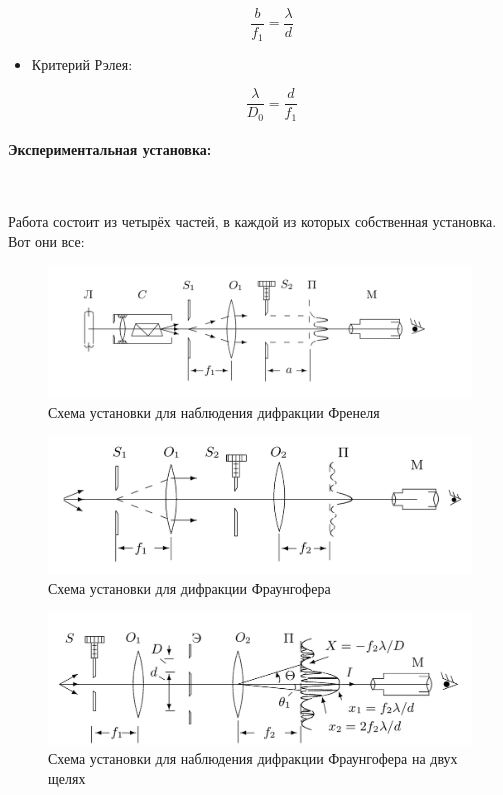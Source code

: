 \documentclass[a4paper, 12pt]{article}
\newcommand{\parag}[1]{\paragraph*{#1:}}
\begin{document}
\begin{itemize}
    \begin{equation*}
        \dfrac{b}{f_1} = \dfrac{\lambda}{d}
    \end{equation*}

    \item Критерий Рэлея:
    
    \begin{equation*}
        \dfrac{\lambda}{D_0} = \dfrac{d}{f_1}
    \end{equation*}
\end{itemize}

\parag {Экспериментальная установка} ~

Работа состоит из четырёх частей, в каждой из которых собственная установка. Вот они все:

\begin{figure}[!h]
    \centering
    \includegraphics[scale = 0.3]{pic1.png}
    \caption{Схема установки для наблюдения дифракции Френеля}
    \label{pic1}
\end{figure}

\begin{figure}[!h]
    \centering
    \includegraphics[scale=0.3]{pic2.png}
    \caption{Схема установки для дифракции Фраунгофера}
    \label{pic2}
\end{figure}

\begin{figure}[!h]
    \centering
    \includegraphics[scale=0.3]{pic3.png}
    \caption{Схема установки для наблюдения дифракции Фраунгофера на двух щелях}   
    \label{pic3} 
\end{figure}
\end{document}
